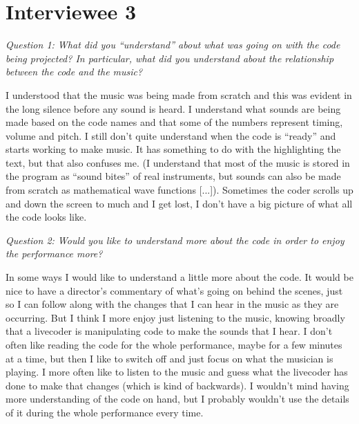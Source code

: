 \section*{Interviewee 3}

\textit{Question 1: What did you ``understand'' about what was going on with the code being projected? In particular, what did you understand about the relationship between the code and the music?}

I understood that the music was being made from scratch and this was evident in the long silence before any sound is heard. I understand what sounds are being made based on the code names and that some of the numbers represent timing, volume and pitch.  I still don't quite understand when the code is ``ready'' and starts working to make music. It has something to do with the highlighting the text, but that also confuses me. (I understand that most of the music is stored in the program as ``sound bites'' of real instruments, but sounds can also be made from scratch as mathematical wave functions [...]). Sometimes the coder scrolls up and down the screen to much and I get lost, I don't have a big picture of what all the code looks like.

\textit{Question 2: Would you like to understand more about the code in order to enjoy the performance more?}

In some ways I would like to understand a little more about the code. It would be nice to have a director's commentary of what's going on behind the scenes, just so I can follow along with the changes that I can hear in the music as they are occurring. But I think I more enjoy just listening to the music, knowing broadly that a livecoder is manipulating code to make the sounds that I hear. I don't often like reading the code for the whole performance, maybe for a few minutes at a time, but then I like to switch off and just focus on what the musician is playing. I more often like to listen to the music and guess what the livecoder has done to make that changes (which is kind of backwards). I wouldn't mind having more understanding of the code on hand, but I probably wouldn't use the details of it during the whole performance every time.
